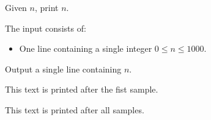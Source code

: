 \problemname{}

\newcommand{\maxn}{1000}

Given $n$, print $n$.

\begin{Input}
    The input consists of:
    \begin{itemize}
        \item One line containing a single integer $0\leq n\leq \maxn$.
    \end{itemize}
\end{Input}

\begin{Output}
    Output a single line containing $n$.
\end{Output}

\nextsample{}
This text is printed after the fist sample.

\remainingsamples{}
This text is printed after all samples.
